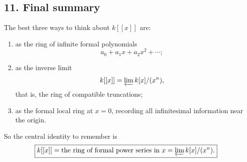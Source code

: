 \documentclass[12pt,a4paper]{article}
\theoremstyle{plain}
\theoremstyle{definition}      %
\begin{document}
	\subsection*{11. Final summary}
	
	The best three ways to think about \(k[[x]]\) are:
	
	\begin{enumerate}
		\item as the ring of infinite formal polynomials
		\[
		a_0+a_1x+a_2x^2+\cdots;
		\]
		
		\item as the inverse limit
		\[
		k[[x]]=\varprojlim k[x]/(x^n),
		\]
		that is, the ring of compatible truncations;
		
		\item as the formal local ring at \(x=0\), recording all infinitesimal information near the origin.
	\end{enumerate}
	
	So the central identity to remember is
	\[
	\boxed{
		k[[x]]
		=
		\text{the ring of formal power series in }x
		=
		\varprojlim k[x]/(x^n).
	}
	\]
	
\end{document}
